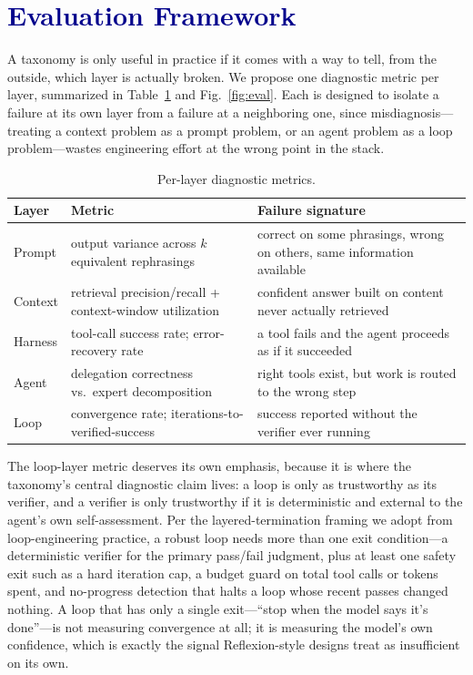 \documentclass[journal]{IEEEtran}
\begin{document}
\section{\textcolor{darkblue}{Evaluation Framework}}

A taxonomy is only useful in practice if it comes with a way to tell, from the outside, which layer is actually broken. We propose one diagnostic metric per layer, summarized in Table~\ref{tab:metrics} and Fig.~\ref{fig:eval}. Each is designed to isolate a failure at its own layer from a failure at a neighboring one, since misdiagnosis---treating a context problem as a prompt problem, or an agent problem as a loop problem---wastes engineering effort at the wrong point in the stack.

\begin{table}[t]
\centering
\caption{Per-layer diagnostic metrics.}
\label{tab:metrics}
\begin{tabular}{@{}p{1.5cm}p{2.6cm}p{3.5cm}@{}}
\toprule
\rowcolor{darkblue!15}
\textbf{Layer} & \textbf{Metric} & \textbf{Failure signature} \\
\midrule
\rowcolor{promptclr!8}
Prompt & output variance across $k$ equivalent rephrasings & correct on some phrasings, wrong on others, same information available \\
\rowcolor{contextclr!8}
Context & retrieval precision/recall + context-window utilization & confident answer built on content never actually retrieved \\
\rowcolor{harnessclr!8}
Harness & tool-call success rate; error-recovery rate & a tool fails and the agent proceeds as if it succeeded \\
\rowcolor{agentclr!8}
Agent & delegation correctness vs.\ expert decomposition & right tools exist, but work is routed to the wrong step \\
\rowcolor{loopclr!8}
Loop & convergence rate; iterations-to-verified-success & success reported without the verifier ever running \\
\bottomrule
\end{tabular}
\end{table}

The loop-layer metric deserves its own emphasis, because it is where the taxonomy's central diagnostic claim lives: a loop is only as trustworthy as its verifier, and a verifier is only trustworthy if it is deterministic and external to the agent's own self-assessment. Per the layered-termination framing we adopt from loop-engineering practice, a robust loop needs more than one exit condition---a deterministic verifier for the primary pass/fail judgment, plus at least one safety exit such as a hard iteration cap, a budget guard on total tool calls or tokens spent, and no-progress detection that halts a loop whose recent passes changed nothing. A loop that has only a single exit---``stop when the model says it's done''---is not measuring convergence at all; it is measuring the model's own confidence, which is exactly the signal Reflexion-style designs treat as insufficient on its own.
\end{document}
